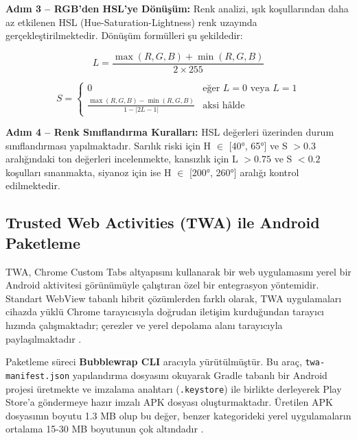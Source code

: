\textbf{Adım 3 -- RGB'den HSL'ye Dönüşüm:} Renk analizi, ışık koşullarından daha az etkilenen HSL (Hue-Saturation-Lightness) renk uzayında gerçekleştirilmektedir. Dönüşüm formülleri şu şekildedir:

\begin{equation}
L = \frac{\max(R,G,B) + \min(R,G,B)}{2 \times 255}
\end{equation}

\begin{equation}
S = \begin{cases} 0 & \text{eğer } L = 0 \text{ veya } L = 1 \\ \frac{\max(R,G,B) - \min(R,G,B)}{1 - |2L - 1|} & \text{aksi hâlde} \end{cases}
\end{equation}

\textbf{Adım 4 -- Renk Sınıflandırma Kuralları:} HSL değerleri üzerinden durum sınıflandırması yapılmaktadır. Sarılık riski için H $\in$ [40°, 65°] ve S $> 0.3$ aralığındaki ton değerleri incelenmekte, kansızlık için L $> 0.75$ ve S $< 0.2$ koşulları sınanmakta, siyanoz için ise H $\in$ [200°, 260°] aralığı kontrol edilmektedir.

\subsection{Trusted Web Activities (TWA) ile Android Paketleme}

TWA, Chrome Custom Tabs altyapısını kullanarak bir web uygulamasını yerel bir Android aktivitesi görünümüyle çalıştıran özel bir entegrasyon yöntemidir. Standart WebView tabanlı hibrit çözümlerden farklı olarak, TWA uygulamaları cihazda yüklü Chrome tarayıcısıyla doğrudan iletişim kurduğundan tarayıcı hızında çalışmaktadır; çerezler ve yerel depolama alanı tarayıcıyla paylaşılmaktadır \cite{google2023twa}.

Paketleme süreci \textbf{Bubblewrap CLI} aracıyla yürütülmüştür. Bu araç, \texttt{twa-manifest.json} yapılandırma dosyasını okuyarak Gradle tabanlı bir Android projesi üretmekte ve imzalama anahtarı (\texttt{.keystore}) ile birlikte derleyerek Play Store'a göndermeye hazır imzalı APK dosyası oluşturmaktadır. Üretilen APK dosyasının boyutu 1.3 MB olup bu değer, benzer kategorideki yerel uygulamaların ortalama 15-30 MB boyutunun çok altındadır \cite{malavolta2015hybrid}.
